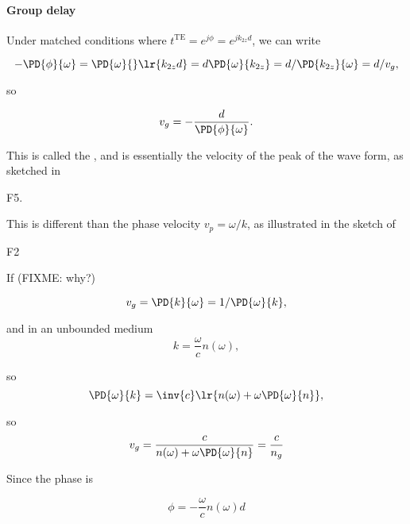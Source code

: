 \paragraph{Group delay}

Under matched conditions where \( t^{\textrm{TE}} = e^{j \phi} = e^{j k_{2z} d} \), we can write

\begin{dmath}\label{eqn:emtLecture10:520}
- \PD{\phi}{\omega} 
= \PD{\omega}{} \lr{ k_{2z} d }
= d \PD{\omega}{k_{2z}}
= d /\PD{k_{2z}}{\omega}
= d / v_g,
\end{dmath}

so 

\begin{dmath}\label{eqn:emtLecture10:540}
v_g = -\frac{d}{\PD{\phi}{\omega}}.
\end{dmath}

This is called the , and is essentially the velocity of the peak of the wave form, as sketched in

F5.

This is different than the phase velocity \( v_p = \omega/k \), as illustrated in the sketch of 

F2

If (FIXME: why?) 

\begin{dmath}\label{eqn:emtLecture10:660}
v_g
= \PD{k}{\omega}
= 1/\PD{\omega}{k},
\end{dmath}

and in an unbounded medium
\begin{dmath}\label{eqn:emtLecture10:560}
   k = \frac{\omega}{c} n(\omega),
\end{dmath}

so
\begin{dmath}\label{eqn:emtLecture10:580}
\PD{\omega}{k} 
= 
\inv{c} \lr{ n(\omega) + \omega \PD{\omega}{n} },
\end{dmath}

so
\begin{equation}\label{eqn:emtLecture10:600}
v_g 
= \frac{c}{n(\omega) + \omega \PD{\omega}{n} }
= \frac{c}{n_g}
\end{equation}

Since the phase is

\begin{dmath}\label{eqn:emtLecture10:680}
\phi = -\frac{\omega}{c} n(\omega) d
\end{dmath}

